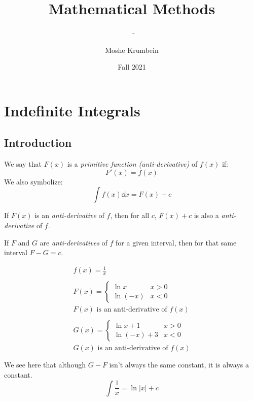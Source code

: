 \documentclass[00_complete]{subfiles}
\title{Mathematical Methods}
\author{Moshe Krumbein}
\date{Fall 2021}
\begin{document}
\setcounter{chapter}{6}

\chapter{Indefinite Integrals}
\subtitle{\theauthor~- \thedate}

\section{Introduction}

\begin{definition}
    We say that $F(x)$ is a \emph{primitive function (anti-derivative)} of
    $f(x)$ if:
    $$F'(x)=f(x)$$
    We also symbolize:
    $$\boxed{\int f(x)\dd{x} = F(x) + c}$$
\end{definition}

\begin{theorem}
    If $F(x)$ is an \emph{anti-derivative} of $f$, then for all $c$, $F(x)+c$ is also
    a \emph{anti-derivative} of $f$.
\end{theorem}

\begin{theorem}
    If $F$ and $G$ are \emph{anti-derivatives} of $f$ for a given interval, then for
    that same interval $F-G=c$.
\end{theorem}

\begin{example}
    $$
    \begin{gathered}
        f(x)=\frac{1}{x} \\ \\
        F(x)=\begin{cases}
            \ln x & x>0 \\
            \ln(-x) & x<0
        \end{cases} \\
        F(x) \text{ is an anti-derivative of } f(x) \\ \\
        G(x) = \begin{cases}
            \ln x + 1 & x>0 \\
            \ln (-x) + 3 & x<0
        \end{cases} \\
        G(x) \text{ is an anti-derivative of } f(x) \\ \\
    \end{gathered}
    $$
    We see here that although $G-F$ isn't always the same constant, it is
    always a constant.
    $$\int \frac{1}{x} = \ln |x| + c$$
\end{example}
\end{document}
